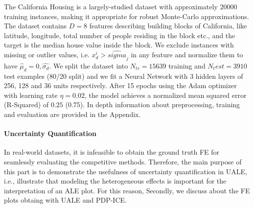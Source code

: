 \documentclass[twoside]{article}
\begin{document}
The California Housing is a largely-studied dataset with approximately
\(20000\) training instances, making it appropriate for robust
Monte-Carlo approximations. The dataset contains \(D=8\) features
describing building blocks of California, like latitude, longitude,
total number of people residing in the block etc., and the target is
the median house value inside the block. We exclude instances with
missing or outlier values, i.e. \(x_d^i > \hat{sigma}_j\) in any
feature and normalize them to have
\(\hat{\mu}_d = 0, \hat{\sigma_d}\). We split the dataset into
\(N_{tr} = 15639\) training and \(N_test = 3910\) test examples (80/20
split) and we fit a Neural Network with 3 hidden layers of 256, 128
and 36 units respectively. After 15 epochs using the Adam optimizer
with learning rate \(\eta = 0.02\), the model achieves a normalized
mean squared error (R-Squared) of \(0.25\) (0.75). In depth information
about preprocessing, training and evaluation are provided in the
Appendix.

\paragraph{Uncertainty Quantification}

In real-world datasets, it is infeasible to obtain the ground truth FE
for seamlessly evaluating the competitive methods. Therefore, the main
purpose of this part is to demonstrate the usefulness of uncertainty
quantification in UALE, i.e., illustrate that modeling the
heterogeneous effects is important for the interpretation of an ALE
plot. For this reason, Secondly, we discuss about the FE plots obtaing with UALE and
PDP-ICE.
\end{document}

